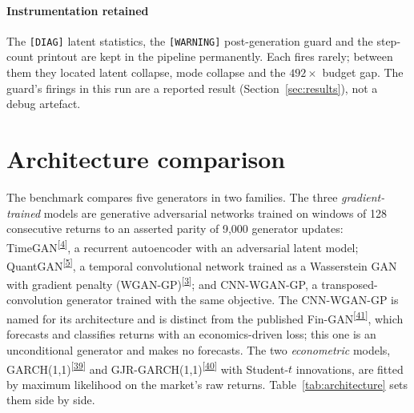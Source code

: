 \documentclass[11pt,a4paper]{article}
\makeatletter
\newcommand{\tcite}[1]{\textsuperscript{[\hyperlink{R:#1}{#1}]}}
\DeclareRobustCommand{\_}{\ifmmode\nfss@text{\textunderscore}\else\textunderscore\allowbreak\fi}
\makeatother
\begin{document}
\paragraph{Instrumentation retained} The \texttt{[DIAG]} latent statistics, the \texttt{[WARNING]} post-generation guard and the step-count printout are kept in the pipeline permanently. Each fires rarely; between them they located latent collapse, mode collapse and the $492\times$ budget gap. The guard's firings in this run are a reported result (Section~\ref{sec:results}), not a debug artefact.
\section{Architecture comparison}
\label{sec:architecture}
The benchmark compares five generators in two families. The three \emph{gradient-trained} models are generative adversarial networks trained on windows of 128 consecutive returns to an asserted parity of 9,000 generator updates: TimeGAN\tcite{4}, a recurrent autoencoder with an adversarial latent model; QuantGAN\tcite{5}, a temporal convolutional network trained as a Wasserstein GAN with gradient penalty (WGAN-GP)\tcite{3}; and CNN-WGAN-GP, a transposed-convolution generator trained with the same objective. The CNN-WGAN-GP is named for its architecture and is distinct from the published Fin-GAN\tcite{41}, which forecasts and classifies returns with an economics-driven loss; this one is an unconditional generator and makes no forecasts. The two \emph{econometric} models, GARCH(1,1)\tcite{39} and GJR-GARCH(1,1)\tcite{40} with Student-$t$ innovations, are fitted by maximum likelihood on the market's raw returns. Table~\ref{tab:architecture} sets them side by side.
\end{document}
